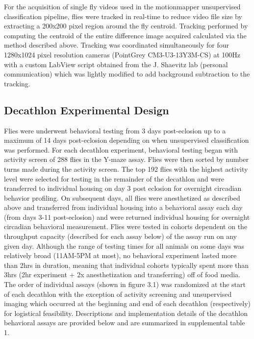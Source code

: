 \documentclass[12pt,letterpaper]{article}
\begin{document}
For the acquisition of single fly videos used in the motionmapper unsupervised classification pipeline, flies were tracked in real-time to reduce video file size by extracting a 200x200 pixel region around the fly centroid. Tracking performed by computing the centroid of the entire difference image acquired calculated via the method described above. Tracking was coordinated simultaneously for four 1280x1024 pixel resolution cameras (PointGrey CM3-U3-13Y3M-CS) at 100Hz with a custom LabView script obtained from the J. Shaevitz lab (personal communication) which was lightly modified to add background subtraction to the tracking.

\subsection{Decathlon Experimental Design}

Flies were underwent behavioral testing from 3 days post-eclosion up to a maximum of 14 days post-eclosion depending on when unsupervised classification was performed. For each decathlon experiment, behavioral testing began with activity screen of 288 flies in the Y-maze assay. Flies were then sorted by number turns made during the activity screen.  The top 192 flies with the highest activity level were selected for testing in the remainder of the decathlon and were transferred to individual housing on day 3 post eclosion for overnight circadian behavior profiling. On subsequent days, all flies were anesthetized as described above and transferred from individual housing into a behavioral assay each day (from days 3-11 post-eclosion) and were returned individual housing for overnight circadian behavioral measurement. Flies were tested in cohorts dependent on the throughput capacity (described for each assay below) of the assay run on any given day. Although the range of testing times for all animals on some days was relatively broad (11AM-5PM at most), no behavioral experiment lasted more than 2hrs in duration, meaning that individual cohorts typically spent more than 3hrs (2hr experiment + 2x anesthetization and transferring) off of food media. The order of individual assays (shown in figure 3.1) was randomized at the start of each decathlon with the exception of activity screening and unsupervised imaging which occurred at the beginning and end of each decathlon (respectively) for logistical feasibility. Descriptions and implementation details of the decathlon behavioral assays are provided below and are summarized in supplemental table 1.
\end{document}
